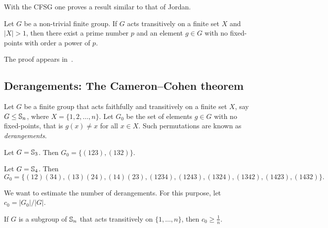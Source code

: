 With the CFSG one proves a result similar to that of Jordan. 

\begin{theorem}
    Let $G$ be a non-trivial finite group. If $G$ acts transitively
    on a finite set $X$ and $|X|>1$, then
    there exist a prime number $p$ and an element $g\in G$ with no fixed-points
    with order a power of $p$.
\end{theorem}

The proof appears in~\cite{MR636194}. 

\subsection{Derangements: The Cameron--Cohen theorem}

Let $G$ be a finite group that acts faithfully and transitively 
on a finite set $X$, say 
$G\leq\mathbb{S}_n$, where $X=\{1,2,\dots,n\}$. Let 
$G_0$ be the set of elements $g\in G$ with no fixed-points, 
that is $g(x)\ne x$ for all $x\in X$. 
Such permutations are known as \emph{derangements}. 

\begin{example}
Let $G=\mathbb{S}_3$. Then $G_0=\{(123),(132)\}$.
\end{example}

\begin{example}
Let $G=\mathbb{S}_4$. Then 
    \[
    G_0=\{(12)(34),(13)(24),(14)(23),(1234),(1243),(1324),(1342),(1423),(1432)\}.
    \]
\end{example}

We want to estimate the number of derangements. For this purpose, let $c_0 = |G_0| / |G|$.



\begin{theorem}
    \label{thm:CameronCohen}
    If $G$ is a subgroup of $\mathbb{S}_n$ that acts transitively on 
    $\{1,\dots,n\}$, then $c_0\geq\frac{1}{n}$.
\end{theorem}

